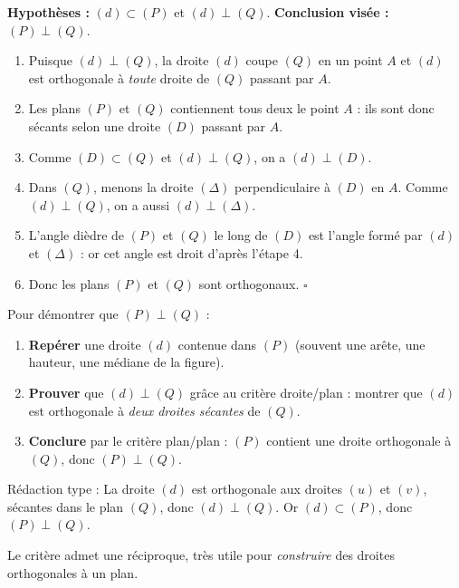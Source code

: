 \documentclass[11pt]{article}
\newcounter{popsec}
\newcounter{popsub}
\newcommand{\courssub}[1]{%
  \stepcounter{popsub}%
  \par\vspace{9pt}\noindent{\popxbold\fontsize{11.5}{13}\selectfont\color{popink}{\color{poporange}\thepopsec.\thepopsub}\hspace{6pt}#1}\par\nopagebreak\vspace{4pt}
}
\begin{document}
\begin{experience}
\textbf{Hypothèses :} $(d) \subset (P)$ et $(d) \perp (Q)$. \textbf{Conclusion visée :} $(P) \perp (Q)$.
\begin{enumerate}
  \item Puisque $(d) \perp (Q)$, la droite $(d)$ coupe $(Q)$ en un point $A$ et $(d)$ est orthogonale à \emph{toute} droite de $(Q)$ passant par $A$.
  \item Les plans $(P)$ et $(Q)$ contiennent tous deux le point $A$ : ils sont donc sécants selon une droite $(D)$ passant par $A$.
  \item Comme $(D) \subset (Q)$ et $(d) \perp (Q)$, on a $(d) \perp (D)$.
  \item Dans $(Q)$, menons la droite $(\Delta)$ perpendiculaire à $(D)$ en $A$. Comme $(d) \perp (Q)$, on a aussi $(d) \perp (\Delta)$.
  \item L'angle dièdre de $(P)$ et $(Q)$ le long de $(D)$ est l'angle formé par $(d)$ et $(\Delta)$ : or cet angle est droit d'après l'étape 4.
  \item Donc les plans $(P)$ et $(Q)$ sont orthogonaux. \hfill $\square$
\end{enumerate}
\end{experience}

\begin{methode}
Pour démontrer que $(P) \perp (Q)$ :
\begin{enumerate}
  \item \textbf{Repérer} une droite $(d)$ contenue dans $(P)$ (souvent une arête, une hauteur, une médiane de la figure).
  \item \textbf{Prouver} que $(d) \perp (Q)$ grâce au critère droite/plan : montrer que $(d)$ est orthogonale à \emph{deux droites sécantes} de $(Q)$.
  \item \textbf{Conclure} par le critère plan/plan : $(P)$ contient une droite orthogonale à $(Q)$, donc $(P) \perp (Q)$.
\end{enumerate}
Rédaction type : \og La droite $(d)$ est orthogonale aux droites $(u)$ et $(v)$, sécantes dans le plan $(Q)$, donc $(d) \perp (Q)$. Or $(d) \subset (P)$, donc $(P) \perp (Q)$. \fg
\end{methode}

\courssub{Propriété réciproque}

Le critère admet une réciproque, très utile pour \emph{construire} des droites orthogonales à un plan.
\end{document}
